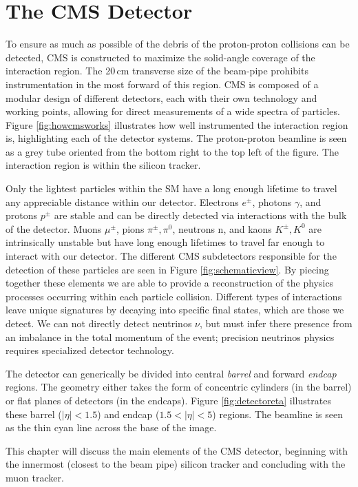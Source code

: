 \chapter{The CMS Detector}
\label{chap:detector}

To ensure as much as possible of the debris of the proton-proton collisions can be detected, CMS is constructed to maximize the solid-angle coverage of the interaction region. The 20$\,$cm transverse size of the beam-pipe prohibits instrumentation in the most forward of this region. CMS is composed of a modular design of different detectors, each with their own technology and working points, allowing for direct measurements of a wide spectra of particles. Figure \ref{fig:howcmsworks} illustrates how well instrumented the interaction region is, highlighting each of the detector systems. The proton-proton beamline is seen as a grey tube oriented from the bottom right to the top left of the figure. The interaction region is within the silicon tracker.

Only the lightest particles within the SM have a long enough lifetime to travel any appreciable distance within our detector. Electrons $e^{\pm}$, photons $\gamma$, and protons $p^{\pm}$ are stable and can be directly detected via interactions with the bulk of the detector. Muons $\mu^{\pm}$, pions $\pi^{\pm}, \pi^{0}$, neutrons n, and kaons $K^{\pm}, K^{0}$ are intrinsically unstable but have long enough lifetimes to travel far enough to interact with our detector. The different CMS subdetectors responsible for the detection of these particles are seen in Figure \ref{fig:schematicview}. By piecing together these elements we are able to provide a reconstruction of the physics processes occurring within each particle collision. Different types of interactions leave unique signatures by decaying into specific final states, which are those we detect. We can not directly detect neutrinos $\nu$, but must infer there presence from an imbalance in the total momentum of the event; precision neutrinos physics requires specialized detector technology.

The detector can generically be divided into central \textit{barrel} and forward \textit{endcap} regions. The geometry either takes the form of concentric cylinders (in the barrel) or flat planes of detectors (in the endcaps). Figure \ref{fig:detectoreta} illustrates these barrel ($|\eta|<1.5$) and endcap ($1.5<|\eta|<5$) regions. The beamline is seen as the thin cyan line across the base of the image.  

This chapter will discuss the main elements of the CMS detector, beginning with the innermost (closest to the beam pipe) silicon tracker and concluding with the muon tracker. 

